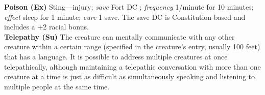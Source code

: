 \textbf{Poison (Ex)} Sting---injury; \textit{save} Fort DC ; \textit{frequency} 1/minute for 10 minutes; \textit{effect} sleep for 1 minute; \textit{cure} 1 save. The save DC is Constitution-based and includes a +2 racial bonus. \\

\textbf{Telepathy (Su)} The creature can mentally communicate with any other creature within a certain range (specified in the creature’s entry, usually 100 feet) that has a language. It is possible to address multiple creatures at once telepathically, although maintaining a telepathic conversation with more than one creature at a time is just as difficult as simultaneously speaking and listening to multiple people at the same time. \\

\newpage
